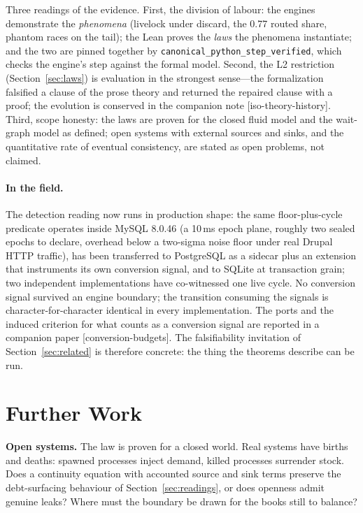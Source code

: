 \documentclass[11pt]{article}
\begin{document}
Three readings of the evidence. First, the division of labour: the
engines demonstrate the \emph{phenomena} (livelock under discard, the
0.77 routed share, phantom races on the tail); the Lean proves the
\emph{laws} the phenomena instantiate; and the two are pinned together
by \texttt{canonical\_python\_step\_verified}, which checks the
engine's step against the formal model. Second, the L2 restriction
(Section~\ref{sec:laws}) is evaluation in the strongest sense---the
formalization falsified a clause of the prose theory and returned the
repaired clause with a proof; the evolution is conserved in the
companion note [iso-theory-history]. Third, scope honesty: the laws are proven for the closed fluid model and the
wait-graph model as defined; open systems with external sources and
sinks, and the quantitative rate of eventual consistency, are stated as
open problems, not claimed.

\paragraph{In the field.} The detection reading now runs in production
shape: the same floor-plus-cycle predicate operates inside MySQL 8.0.46
(a 10\,ms epoch plane, roughly two sealed epochs to declare, overhead
below a two-sigma noise floor under real Drupal HTTP traffic), has been
transferred to PostgreSQL as a sidecar plus an extension that
instruments its own conversion signal, and to SQLite at
transaction grain; two independent implementations have co-witnessed
one live cycle. No conversion signal survived an engine boundary; the
transition consuming the signals is character-for-character identical
in every implementation. The ports and the induced criterion for what
counts as a conversion signal are reported in a companion paper
[conversion-budgets]. The falsifiability invitation of
Section~\ref{sec:related} is therefore concrete: the thing the
theorems describe can be run.

\section{Further Work}
\label{sec:further}

\textbf{Open systems.} The law is proven for a closed world. Real
systems have births and deaths: spawned processes inject demand,
killed processes surrender stock. Does a continuity equation with
accounted source and sink terms preserve the debt-surfacing behaviour
of Section~\ref{sec:readings}, or does openness admit genuine leaks?
Where must the boundary be drawn for the books still to balance?
\end{document}
